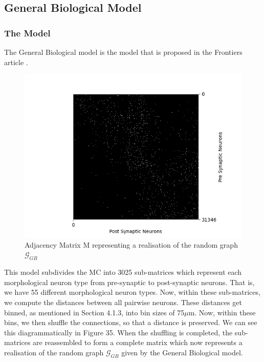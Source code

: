 \newpage
\subsection{General Biological Model}
\subsubsection{The Model}
The General Biological model is the model that is proposed in the Frontiers article \cite{Reimann_2017}. 

\begin{figure}[H]
\begin{center}
\captionsetup{justification=centering}
\includegraphics[width=12cm]{GB/matrix_general_biol.png}
\caption{Adjacency Matrix M representing a realisation of the random graph $\mathcal{G}_{GB}$}
\end{center}
\end{figure}

This model subdivides the MC into 3025 sub-matrices which represent each morphological neuron type from pre-synaptic to post-synaptic neurons. That is, we have 55 different morphological neuron types. Now, within these sub-matrices, we compute the distances between all pairwise neurons. These distances get binned, as mentioned in Section 4.1.3, into bin sizes of 75$\mu$m. Now, within these bins, we then shuffle the connections, so that a distance is preserved. We can see this diagrammatically in Figure 35. When the shuffling is completed, the sub-matrices are reassembled to form a complete matrix which now represents a realisation of the random graph $\mathcal{G}_{GB}$ given by the General Biological model. 

